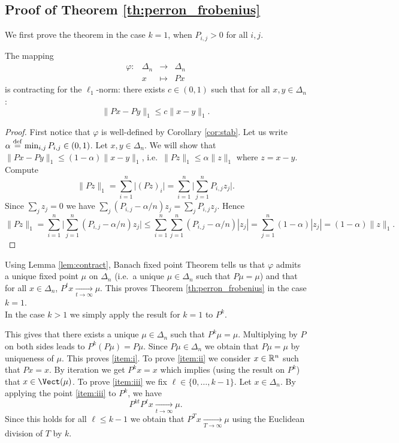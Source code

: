 \documentclass[11pt,nocut]{article}
\begin{document}
\subsection{Proof of Theorem \ref{th:perron_frobenius}}
We first prove the theorem in the case $k=1$, when $P_{i,j} > 0$ for all $i,j$.
\begin{lemma}\label{lem:contract}
	The mapping 
	$$
	\begin{array}{cccc}
		\varphi:& \Delta_n &\to& \Delta_n \\
				& x & \mapsto & Px
	\end{array}
	$$
	is contracting for the $\ell_1$-norm: there exists $c \in (0,1)$ such that for all $x,y \in \Delta_n$:
	$$
	\| Px - Py \|_1 \leq c \| x-y\|_1.
	$$
\end{lemma}
\begin{proof}
	First notice that $\varphi$ is well-defined by Corollary \ref{cor:stab}.
	Let us write $\alpha \overset{\rm def}{=} \min_{i,j} P_{i,j} \in (0,1)$.
	Let $x,y \in \Delta_n$. We will show that $\| Px - Py \|_1 \leq (1-\alpha) \| x-y\|_1$, i.e.\ $\|P z\|_1 \leq \alpha \|z\|_1$ where $z = x-y$. Compute
	$$
	\| P z\|_1 
	= \sum_{i=1}^n \big| (Pz)_i \big|
	= \sum_{i=1}^n \Big| \sum_{j=1}^n P_{i,j}z_j \Big|.
	$$
	Since $\sum_{j} z_j = 0$ we have $\sum_j (P_{i,j} - \alpha/n) z_j = \sum_j P_{i,j} z_j$. Hence
	$$
	\| P z\|_1 
	= \sum_{i=1}^n \Big| \sum_{j=1}^n (P_{i,j} - \alpha/n) z_j \Big|
	\leq \sum_{i=1}^n \sum_{j=1}^n (P_{i,j} - \alpha/n) |z_j| 
	= \sum_{j=1}^n (1-\alpha) |z_j|
	= (1-\alpha) \|z\|_1.
	$$
\end{proof}

Using Lemma \ref{lem:contract}, Banach fixed point Theorem tells us that $\varphi$ admits a unique fixed point $\mu$ on $\Delta_n$ (i.e.\ a unique $\mu \in \Delta_n$ such that $P\mu = \mu$) and that for all $x \in \Delta_n$, $P^t x \xrightarrow[t \to \infty]{} \mu$. This proves Theorem \ref{th:perron_frobenius} in the case $k=1$.
\\

In the case $k > 1$ we simply apply the result for $k=1$ to $P^k$.

This gives that there exists a unique $\mu \in \Delta_n$ such that $P^k \mu = \mu$. Multiplying by $P$ on both sides leads to $P^k (P\mu) = P\mu$. 
Since $P\mu \in \Delta_n$ we obtain that $P\mu = \mu$ by uniqueness of $\mu$. This proves \ref{item:i}. To prove \ref{item:ii} we consider $x \in \mathbb{R}^n$ such that $P x = x$. By iteration we get $P^k x = x$ which implies (using the result on $P^k$) that $x \in \Vect(\mu)$.
To prove \ref{item:iii} we fix $\ell \in \{0, \dots, k-1\}$. Let $x \in \Delta_n$. By applying the point \ref{item:iii} to $P^k$, we have 
$$
P^{kt} P^{\ell} x \xrightarrow[t \to \infty]{} \mu.
$$
Since this holds for all $\ell \leq k-1$ we obtain that $P^T x \xrightarrow[T \to \infty]{} \mu$ using the Euclidean division of $T$ by $k$.
\end{document}
